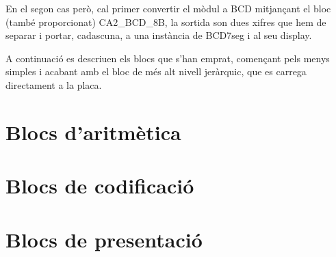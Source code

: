 En el segon cas però, cal primer convertir el mòdul a BCD
mitjançant el bloc (també proporcionat) \textsf{CA2\_BCD\_8B}, la sortida son dues
xifres que hem de separar i portar, cadascuna, a una instància de \textsf{BCD7seg}
i al seu display.

A continuació es descriuen els blocs que s'han emprat, començant pels menys
simples i acabant amb el bloc de més alt nivell jeràrquic, que es carrega
directament a la placa.

  \cclearpage
\section{Blocs d'aritmètica}
  \cclearpage
{}
  \cclearpage
{}
  \cclearpage
{}
  \cclearpage
{}
  \cclearpage
{}

  \cclearpage
\section{Blocs de codificació}
  \cclearpage
{}
  \cclearpage
{}

  \cclearpage
\section{Blocs de presentació}
  \cclearpage
{}
  \cclearpage
{}
  \cclearpage
{}
  \cclearpage
{}





